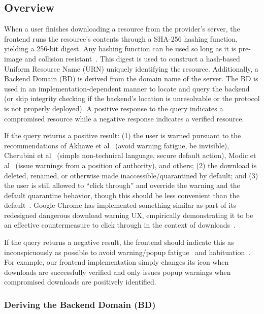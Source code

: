 \subsection{Overview}

When a user finishes downloading a resource from the provider's server, the
frontend runs the resource's contents through a SHA-256 hashing function,
yielding a 256-bit digest. Any hashing function can be used so long as it is
pre-image and collision resistant~\cite{Rogaway}. This digest is used to
construct a hash-based Uniform Resource Name (URN) uniquely identifying the
resource. Additionally, a Backend Domain (BD) is derived from the domain name of
the server. The BD is used in an implementation-dependent manner to locate and
query the backend (or skip integrity checking if the backend's location is
unresolvable or the \SYSTEM{} protocol is not properly deployed). A positive
response to the query indicates a compromised resource while a negative response
indicates a verified resource.

If the query returns a positive result: (1) the user is warned pursuant to the
recommendations of Akhawe et al~\cite{Akhawe} (avoid warning fatigue, be
invisible), Cherubini et al~\cite{Cherubini} (simple non-technical language,
secure default action), Modic et al~\cite{Modic} (issue warnings from a position
of authority), and others; (2) the download is deleted, renamed, or otherwise
made inaccessible/quarantined by default; and (3) the user is still allowed to
``click through'' and override the warning and the default quarantine behavior,
though this should be less convenient than the default~\cite{Cherubini}. Google
Chrome has implemented something similar as part of its redesigned dangerous
download warning UX, empirically demonstrating it to be an effective
countermeasure to click through in the context of
downloads~\cite{ChromeClickThrough}.

If the query returns a negative result, the frontend should indicate this as
inconspicuously as possible to avoid warning/popup fatigue~\cite{Akhawe,
Cherubini} and habituation~\cite{Sunshine}. For example, our frontend
implementation simply changes its icon when downloads are successfully verified
and only issues popup warnings when compromised downloads are positively
identified.

\subsubsection{Deriving the Backend Domain (BD)}

